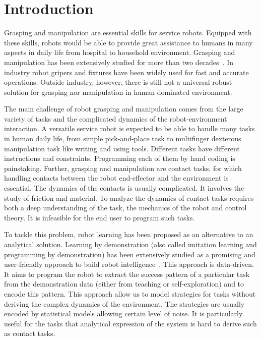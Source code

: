 \chapter{Introduction}
\label{cha1}

Grasping and manipulation are essential skills for service robots. Equipped with these skills, robots would be able to provide great assistance to humans in many aspects in daily life from hospital to household environment. Grasping and manipulation has been extensively studied for more than two decades~\citep{}. In industry robot gripers and fixtures have been widely used for fast and accurate operations. Outside industry, however, there is still not a universal robust solution for grasping nor manipulation in human dominated environment.


The main challenge of robot grasping and manipulation comes from the large variety of tasks and the complicated dynamics of the robot-environment interaction. A versatile service robot is expected to be able to handle many tasks in human daily life, from simple pick-and-place task to multifinger dexterous manipulation task like writing and using tools. Different tasks have different instructions and constraints. Programming each of them by hand coding is painstaking. Further, grasping and manipulation are contact tasks, for which handling contacts between the robot end-effector and the environment is essential. The dynamics of the contacts is usually complicated. It involves the study of friction and material. To analyze the dynamics of contact tasks requires both a deep understanding of the task, the mechanics of the robot and control theory. It is infeasible for the end user to program such tasks.

To tackle this problem, robot learning has been proposed as an alternative to an analytical solution. Learning by demonstration (also called imitation learning and programming by demonstration) has been extensively studied as a promising and user-friendly approach to build robot intelligence~\citep{schaal2003computational,dillmann2004teaching,billard2006discriminative,calinon2007incremental}. This approach is data-driven. It aims to program the robot to extract the success pattern of a particular task from the demonstration data (either from teaching or self-exploration) and to encode this pattern. This approach allow us to model strategies for tasks without deriving the complex dynamics of the environment. The strategies are usually encoded by statistical models allowing certain level of noise. It is particularly useful for the tasks that analytical expression of the system is hard to derive such as contact tasks.


